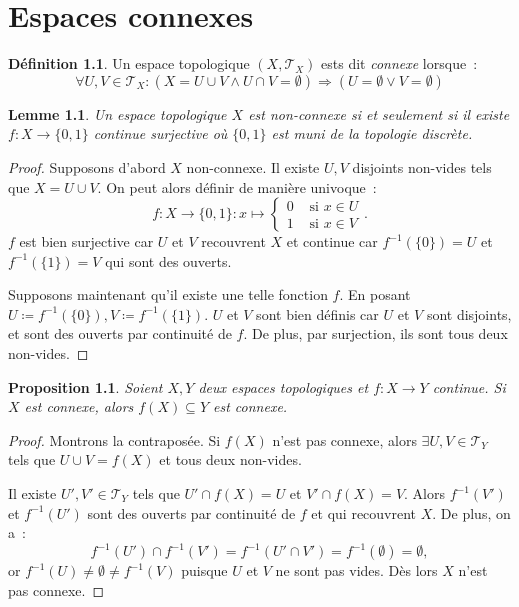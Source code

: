 \documentclass{report}
\newtheorem{prp}[thm]{Proposition}
\newtheorem{lem}[thm]{Lemme}
\theoremstyle{definition}
\newtheorem{déf}[thm]{Définition}
\theoremstyle{remark}
\renewcommand{\top}{\mathcal T}
\begin{document}
\chapter{Espaces connexes}
	\begin{déf} Un espace topologique $(X, \top_X)$ ests dit \textit{connexe} lorsque~:
	\[\forall U, V \in \top_X : \left(X = U \cup V \land U \cap V = \emptyset\right) \Rightarrow \left(U = \emptyset \lor V = \emptyset\right)\]
	\end{déf}

	\begin{lem} Un espace topologique $X$ est non-connexe si et seulement si il existe $f : X \to \{0, 1\}$ continue surjective où $\{0, 1\}$ est muni de la topologie
	discrète.
	\end{lem}

	\begin{proof} Supposons d'abord $X$ non-connexe. Il existe $U, V$ disjoints non-vides tels que $X = U \cup V$. On peut alors définir de manière univoque~:
	\[f : X \to \{0, 1\} : x \mapsto \begin{cases} 0 &\text{ si } x \in U \\1 &\text{ si } x \in V\end{cases}.\]
	$f$ est bien surjective car $U$ et $V$ recouvrent $X$ et continue car $f^{-1}(\{0\}) = U$ et $f^{-1}(\{1\}) = V$ qui sont des ouverts.

	Supposons maintenant qu'il existe une telle fonction $f$. En posant $U \coloneqq f^{-1}(\{0\}), V \coloneqq f^{-1}(\{1\})$. $U$ et $V$ sont bien définis car $U$ et
	$V$ sont disjoints, et sont des ouverts par continuité de $f$. De plus, par surjection, ils sont tous deux non-vides.
	\end{proof}

	\begin{prp} Soient $X, Y$ deux espaces topologiques et $f : X \to Y$ continue. Si $X$ est connexe, alors $f(X) \subseteq Y$ est connexe.
	\end{prp}

	\begin{proof} Montrons la contraposée. Si $f(X)$ n'est pas connexe, alors $\exists U, V \in \top_Y$ tels que $U \cup V = f(X)$ et tous deux non-vides.

	Il existe $U', V' \in \top_Y$ tels que $U' \cap f(X) = U$ et $V' \cap f(X) = V$. Alors $f^{-1}(V')$ et $f^{-1}(U')$ sont des ouverts par continuité de $f$ et
	qui recouvrent $X$. De plus, on a~:
	\[f^{-1}(U') \cap f^{-1}(V') = f^{-1}(U' \cap V') = f^{-1}(\emptyset) = \emptyset,\]
	or $f^{-1}(U) \neq \emptyset \neq f^{-1}(V)$ puisque $U$ et $V$ ne sont pas vides. Dès lors $X$ n'est pas connexe.
	\end{proof}
\end{document}
